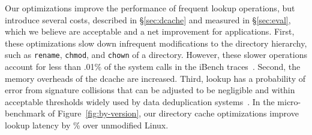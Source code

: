 Our optimizations improve the performance of frequent lookup operations, but 
introduce several costs, described in \S\ref{sec:dcache} and measured in \S\ref{sec:eval},
which  we believe are acceptable and a net improvement for applications.
First, these optimizations slow down infrequent modifications to the directory hierarchy, such as {\tt rename}, {\tt chmod},
 and {\tt chown} of a directory. 
However, these slower operations
account for less than .01\% of the system calls in the iBench traces~\cite{filenotafile}.
Second,  the memory overheads of the dcache are increased.
Third, lookup has a 
probability of error from signature collisions that can be adjusted to be negligible
and within acceptable thresholds widely used by data deduplication systems~\cite{Debnath:2010:CSU:1855840.1855856, Srinivasan:2012:ILI:2208461.2208485, Quinlan:2002:VNA:645371.651321, Zhu:2008:ADB:1364813.1364831}.
In the micro-benchmark of Figure~\ref{fig:by-version}, our directory cache 
optimizations improve lookup latency by 
\statspeedup{}\% over unmodified Linux.

